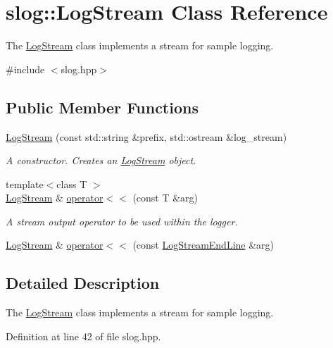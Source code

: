 \hypertarget{classslog_1_1LogStream}{}\section{slog\+:\+:Log\+Stream Class Reference}
\label{classslog_1_1LogStream}


The \hyperlink{classslog_1_1LogStream}{Log\+Stream} class implements a stream for sample logging.  




{\ttfamily \#include $<$slog.\+hpp$>$}

\subsection*{Public Member Functions}
\begin{DoxyCompactItemize}
\item 
\hyperlink{classslog_1_1LogStream_ae6947cb3d25a84ca7853b5e62579c257}{Log\+Stream} (const std\+::string \&prefix, std\+::ostream \&log\+\_\+stream)
\begin{DoxyCompactList}\small\item\em A constructor. Creates an \hyperlink{classslog_1_1LogStream}{Log\+Stream} object. \end{DoxyCompactList}\item 
{\footnotesize template$<$class T $>$ }\\\hyperlink{classslog_1_1LogStream}{Log\+Stream} \& \hyperlink{classslog_1_1LogStream_ac265c41ce68be9f1b42e540e99e4f182}{operator$<$$<$} (const T \&arg)
\begin{DoxyCompactList}\small\item\em A stream output operator to be used within the logger. \end{DoxyCompactList}\item 
\hyperlink{classslog_1_1LogStream}{Log\+Stream} \& \hyperlink{classslog_1_1LogStream_adbbee3626b1771055c484a67272e905b}{operator$<$$<$} (const \hyperlink{classslog_1_1LogStreamEndLine}{Log\+Stream\+End\+Line} \&arg)
\end{DoxyCompactItemize}


\subsection{Detailed Description}
The \hyperlink{classslog_1_1LogStream}{Log\+Stream} class implements a stream for sample logging. 

Definition at line 42 of file slog.\+hpp.




